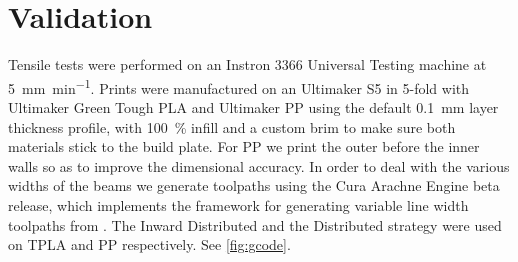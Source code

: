 \section{Validation}
Tensile tests were performed on an Instron 3366 Universal Testing machine at \SI{5}{\milli\meter\per\minute}.
Prints were manufactured on an Ultimaker S5 in 5-fold with Ultimaker Green Tough PLA and Ultimaker PP using the default \SI{0.1}{\milli\meter} layer thickness profile,
with \SI{100}{\percent} infill and a custom brim to make sure both materials stick to the build plate.
For PP we print the outer before the inner walls so as to improve the dimensional accuracy. %
In order to deal with the various widths of the beams we generate toolpaths using the Cura Arachne Engine beta release\cite{CuraArachne},
which implements the framework for generating variable line width toolpaths from \cite{Kuipers2020}.
The Inward Distributed and the Distributed strategy were used on TPLA and PP respectively.
See \cref{fig:gcode}.



